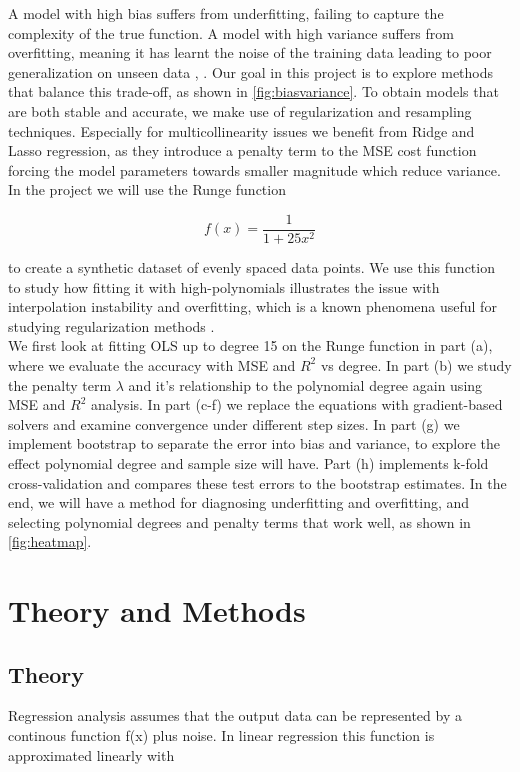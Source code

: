 \documentclass[amssymb,twocolumn,aps]{revtex4-2}
\begin{document}
A model with high bias suffers from underfitting, failing to capture the complexity of the true function. A model with high variance suffers from overfitting, meaning it has learnt the noise of the training data leading to poor generalization on unseen data \cite{compfys38}, \cite{hastie}. Our goal in this project is to explore methods that balance this trade-off, as shown in \ref{fig:biasvariance}. To obtain models that are both stable and accurate, we make use of regularization and resampling techniques. Especially for multicollinearity issues we benefit from Ridge and Lasso regression, as they introduce a penalty term to the MSE cost function forcing the model parameters towards smaller magnitude which reduce variance. \\

In the project we will use the Runge function

\begin{equation}
    f(x) = \frac{1}{1 + 25x^2}
\end{equation}

to create a synthetic dataset of evenly spaced data points. We use this function to study how fitting it with high-polynomials illustrates the issue with interpolation instability and overfitting, which is a known phenomena useful for studying regularization methods \cite{wikipedia-runge}. \\

We first look at fitting OLS up to degree 15 on the Runge function in part (a), where we evaluate the accuracy with MSE and $R^2$ vs degree. In part (b) we study the penalty term $\lambda$ and it's relationship to the polynomial degree again using MSE and $R^2$ analysis. In part (c-f) we replace the equations with gradient-based solvers and examine convergence under different step sizes. In part (g) we implement bootstrap to separate the error into bias and variance, to explore the effect polynomial degree and sample size will have. Part (h) implements k-fold cross-validation and compares these test errors to the bootstrap estimates. In the end, we will have a method for diagnosing underfitting and overfitting, and selecting polynomial degrees and penalty terms that work well, as shown in \ref{fig:heatmap}. 

\section{Theory and Methods}

\subsection{Theory}
\label{subsection:theory}
Regression analysis assumes that the output data can be represented by a continous function f(x) plus noise. In linear regression this function is approximated linearly with 
\end{document}
